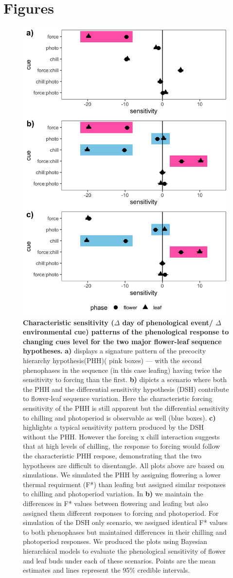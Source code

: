 \documentclass[11pt]{article}\usepackage[]{graphicx}\usepackage[]{color}
\begin{document}
{\section*{Figures}
\begin{figure}[h!]
    \centering
         \includegraphics[width=.7\textwidth]{..//Plots/Flobuds_manuscript_figs/simulations.png}
    \caption{\textbf{Characteristic sensitivity ($\Delta$ day of phenological event/ $\Delta$ environmental cue) patterns of the phenological response to changing cues level for the two major flower-leaf sequence hypotheses.}  \textbf{a)} displays a signature pattern of the precocity hierarchy hypothesis(PHH)( pink boxes) --- with the second phenophases in the sequence (in this case leafing) having twice the sensitivity to forcing than the first. \textbf{b)} dipicts a scenario where both the PHH and the differential sensitivity hypothesis (DSH) contribute to flower-leaf sequence variation. Here the characteristic forcing sensitivity of the PHH is still apparent but the differential sensitivity to chilling and photoperiod is observable as well (blue boxes). \textbf{c)} highlights a typical sensitivity pattern produced by the DSH without the PHH. However the forcing x chill interaction suggests that at high levels of chilling, the response to forcing would follow the characteristic PHH respose, demonstrating that the two hypotheses are difficult to disentangle. All plots above are based on simulations. We simulated the PHH by assigning flowering a lower thermal requirment (F*) than leafing but assigned similar responses to chilling and photoperiod variation. In \textbf{b)} we maintain the differences in F* values between flowering and leafing but also assigned them different responses to forcing and photoperiod. For simulation of the DSH only scenario, we assigned identical F* values to both phenophases but maintained differences in their chilling and photoperiod responses. We produced the plots using Bayesian hierarchical models to evaluate the phenological sensitivity  of flower and leaf buds under each of these scenarios. Points are the mean estimates and lines represent the 95\% credible intervals. } 

\end{figure}}
\end{document}
